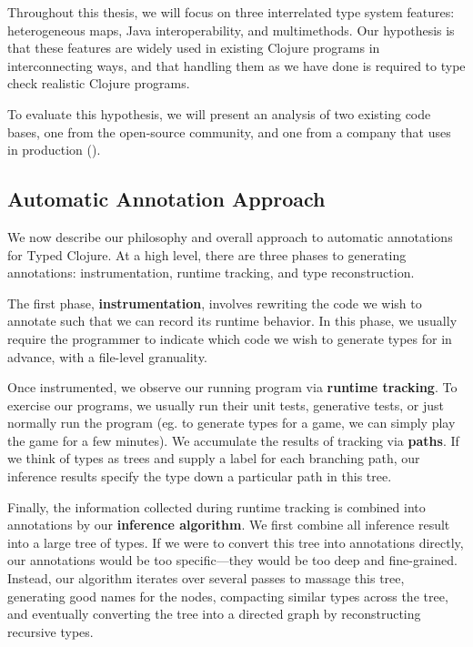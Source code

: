 \documentclass[9pt]{extarticle}
\begin{document}
Throughout this thesis, we will focus on three interrelated type
system features: heterogeneous maps, Java interoperability, and
multimethods. Our hypothesis is that these features are widely used in
existing Clojure programs in interconnecting ways, and that handling
them as we have done is required to type check realistic Clojure
programs.

To evaluate this hypothesis, we will present an analysis of two existing \coretyped{}
code bases, one from the open-source community, and one from a company
that uses \coretyped{} in production ().

\subsection{Automatic Annotation Approach}

We now describe our philosophy and overall approach to automatic annotations for Typed Clojure.
At a high level, there are three phases to
generating annotations: instrumentation, runtime tracking, and type reconstruction.

The first phase, \textbf{instrumentation}, involves
rewriting the code we wish to annotate such
that we can record its runtime behavior.
In this phase, we usually require the programmer to
indicate which code we wish to generate types
for in advance, with a file-level granuality.

Once instrumented, we observe our running program
via \textbf{runtime tracking}. To exercise our programs,
we usually run their unit tests, generative tests,
or just normally run the program (eg. to generate types for
a game, we can simply play the game for a few minutes).
We accumulate the results of tracking via \textbf{paths}.
If we think of types as trees and supply a label
for each branching path, our inference results
specify the type down a particular path in this tree.

Finally, the information collected during runtime tracking
is combined into annotations by our \textbf{inference algorithm}.
We first combine all inference result into a large tree of
types. If we were to convert this tree into annotations directly,
our annotations would be too specific---they would be too
deep and fine-grained.
Instead, our algorithm iterates over several passes to massage
this tree, generating good names for the nodes, compacting similar
types across the tree, and
eventually converting the tree into a directed graph by reconstructing
recursive types.
\end{document}

